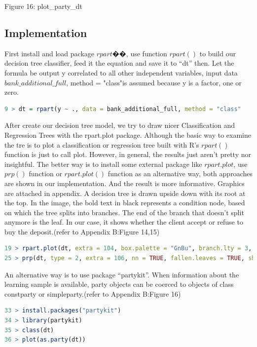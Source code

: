 \documentclass[12pt, a4paper, bibliography=totoc, english]{scrartcl}
\begin{document}
Figure 16: plot\_party\_dt\subsection{Implementation}

First install and load package $rpart$��, use function $rpart( )$ to build our decision tree classifier, feed it the equation and save it to “dt” then. Let the formula be output y correlated to all other independent variables, input data $bank\_additional\_full$, method = "class"is assumed because y is a factor, one or zero. 

\begin{lstlisting}[language = R]
9 > dt = rpart(y ~ ., data = bank_additional_full, method = "class"
\end{lstlisting}

After create our decision tree model, we try to draw nicer Classification and Regression Trees with the rpart.plot package. Although the basic way to examine the tre is to plot a classification or regression tree built with R’s $rpart()$ function is just to call plot. However, in general, the results just aren’t pretty nor insightful. The better way is to install some external package like $rpart.plot$, use $prp()$ function or $rpart.plot()$ function as an alternative way, both approaches are shown in our implementation. And the result is more informative. Graphics are attached in appendix. A decision tree is drawn upside down with its root at the top. In the image, the bold text in black represents a condition node, based on which the tree splits into branches. The end of the branch that doesn’t split anymore is the leaf. In our case, it shows whether the client accept or refuse to buy the deposit.(refer to Appendix B:Figure 14,15)

\begin{lstlisting}[language = R]
19 > rpart.plot(dt, extra = 104, box.palette = "GnBu", branch.lty = 3, shadow.col = "gray", nn = TRUE)  
25 > prp(dt, type = 2, extra = 106, nn = TRUE, fallen.leaves = TRUE, shadow.col = "grey")   

\end{lstlisting}

An alternative way is to use package “partykit”. When information about the learning sample is available, party objects can be coerced to objects of class constparty or simpleparty.(refer to Appendix B:Figure 16)

\begin{lstlisting}[language = R]
33 > install.packages("partykit")
34 > library(partykit)
35 > class(dt)
36 > plot(as.party(dt))
\end{lstlisting}
\end{document}
